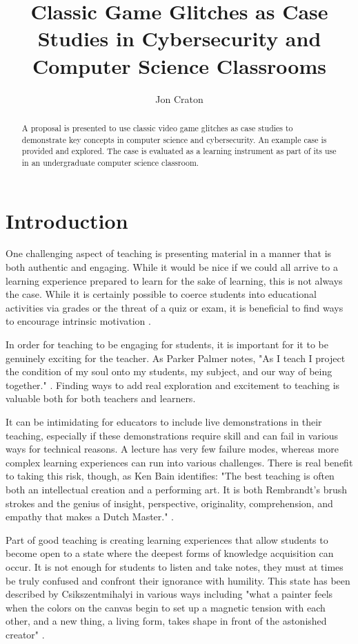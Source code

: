 \documentclass[letterpaper]{article}
\title{Classic Game Glitches as Case Studies in Cybersecurity and Computer Science Classrooms}
\author[1]{Jon Craton}
\affil[1]{Anderson University, Anderson, IN}
\date{} %
\begin{document}
\maketitle

\begin{abstract}
A proposal is presented to use classic video game glitches as case studies to demonstrate key concepts in computer science and cybersecurity. An example case is provided and explored. The case is evaluated as a learning instrument as part of its use in an undergraduate computer science classroom.
\end{abstract}

\section{Introduction}
One challenging aspect of teaching is presenting material in a manner that is both authentic and engaging. While it would be nice if we could all arrive to a learning experience prepared to learn for the sake of learning, this is not always the case. While it is certainly possible to coerce students into educational activities via grades or the threat of a quiz or exam, it is beneficial to find ways to encourage intrinsic motivation \cite{deci2013intrinsic}.

In order for teaching to be engaging for students, it is important for it to be genuinely exciting for the teacher. As Parker Palmer notes, "As I teach I project the condition of my soul onto my students, my subject, and our way of being together." \cite{palmer2000courage}. Finding ways to add real exploration and excitement to teaching is valuable both for both teachers and learners.

It can be intimidating for educators to include live demonstrations in their teaching, especially if these demonstrations require skill and can fail in various ways for technical reasons. A lecture has very few failure modes, whereas more complex learning experiences can run into various challenges. There is real benefit to taking this risk, though, as Ken Bain identifies: "The best teaching is often both an intellectual creation and a performing art. It is both Rembrandt’s brush strokes and the genius of insight, perspective, originality, comprehension, and empathy that makes a Dutch Master." \cite{bain2004best}.

Part of good teaching is creating learning experiences that allow students to become open to a state where the deepest forms of knowledge acquisition can occur. It is not enough for students to listen and take notes, they must at times be truly confused and confront their ignorance with humility. This state has been described by Csikszentmihalyi in various ways including  "what a painter feels when the colors on the canvas begin to set up a magnetic tension with each other, and a new thing, a living form, takes shape in front of the astonished creator" \cite{csikszentmihalyi1990flow}.
\end{document}

